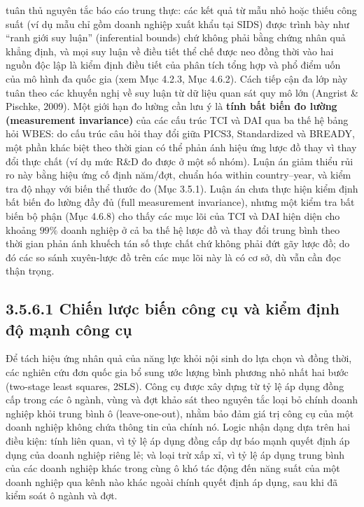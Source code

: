\documentclass[
  a4paper,
  13pt]{extreport}
\begin{document}
tuân thủ nguyên tắc báo cáo trung thực: các kết quả từ mẫu nhỏ hoặc
thiếu công suất (ví dụ mẫu chỉ gồm doanh nghiệp xuất khẩu tại SIDS) được
trình bày như ``ranh giới suy luận'' (inferential bounds) chứ không phải
bằng chứng nhân quả khẳng định, và mọi suy luận về điều tiết thể chế
được neo đồng thời vào hai nguồn độc lập là kiểm định điều tiết của phân
tích tổng hợp và phổ điểm uốn của mô hình đa quốc gia (xem Mục 4.2.3,
Mục 4.6.2). Cách tiếp cận đa lớp này tuân theo các khuyến nghị về suy
luận từ dữ liệu quan sát quy mô lớn (Angrist \& Pischke, 2009). Một giới
hạn đo lường cần lưu ý là \textbf{tính bất biến đo lường (measurement
invariance)} của các cấu trúc TCI và DAI qua ba thế hệ bảng hỏi WBES: do
cấu trúc câu hỏi thay đổi giữa PICS3, Standardized và BREADY, một phần
khác biệt theo thời gian có thể phản ánh hiệu ứng lược đồ thay vì thay
đổi thực chất (ví dụ mức R\&D đo được ở một số nhóm). Luận án giảm thiểu
rủi ro này bằng hiệu ứng cố định năm/đợt, chuẩn hóa within
country--year, và kiểm tra độ nhạy với biến thể thước đo (Mục 3.5.1).
Luận án chưa thực hiện kiểm định bất biến đo lường đầy đủ (full
measurement invariance), nhưng một kiểm tra bất biến bộ phận (Mục 4.6.8)
cho thấy các mục lõi của TCI và DAI hiện diện cho khoảng \(99\%\) doanh
nghiệp ở cả ba thế hệ lược đồ và thay đổi trung bình theo thời gian phản
ánh khuếch tán số thực chất chứ không phải đứt gãy lược đồ; do đó các so
sánh xuyên-lược đồ trên các mục lõi này là có cơ sở, dù vẫn cần đọc thận
trọng.

\hypertarget{chiux1ebfn-lux1b0ux1ee3c-biux1ebfn-cuxf4ng-cux1ee5-vuxe0-kiux1ec3m-ux111ux1ecbnh-ux111ux1ed9-mux1ea1nh-cuxf4ng-cux1ee5}{%
\subsection{3.5.6.1 Chiến lược biến công cụ và kiểm định độ mạnh công
cụ}\label{chiux1ebfn-lux1b0ux1ee3c-biux1ebfn-cuxf4ng-cux1ee5-vuxe0-kiux1ec3m-ux111ux1ecbnh-ux111ux1ed9-mux1ea1nh-cuxf4ng-cux1ee5}}

Để tách hiệu ứng nhân quả của năng lực khỏi nội sinh do lựa chọn và đồng
thời, các nghiên cứu đơn quốc gia bổ sung ước lượng bình phương nhỏ nhất
hai bước (two-stage least squares, 2SLS). Công cụ được xây dựng từ tỷ lệ
áp dụng đồng cấp trong các ô ngành, vùng và đợt khảo sát theo nguyên tắc
loại bỏ chính doanh nghiệp khỏi trung bình ô (leave-one-out), nhằm bảo
đảm giá trị công cụ của một doanh nghiệp không chứa thông tin của chính
nó. Logic nhận dạng dựa trên hai điều kiện: tính liên quan, vì tỷ lệ áp
dụng đồng cấp dự báo mạnh quyết định áp dụng của doanh nghiệp riêng lẻ;
và loại trừ xấp xỉ, vì tỷ lệ áp dụng trung bình của các doanh nghiệp
khác trong cùng ô khó tác động đến năng suất của một doanh nghiệp qua
kênh nào khác ngoài chính quyết định áp dụng, sau khi đã kiểm soát ô
ngành và đợt.
\end{document}

